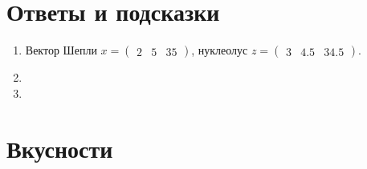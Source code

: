 \documentclass[12pt]{article} %
\theoremstyle{definition} %
\begin{document}
\newpage
\section{Ответы и подсказки}

\begin{enumerate}
\item Вектор Шепли $x=\begin{pmatrix}
2 & 5 & 35    
\end{pmatrix}$, нуклеолус
$z= \begin{pmatrix}
3 & 4.5 & 34.5    
\end{pmatrix}$.

\item 

\item 

\end{enumerate}

\section{Вкусности}

\nocite{zadachi4mathcult} 
\nocite{zadachnik4tigers}

\printbibliography[heading=none]
\end{document}
